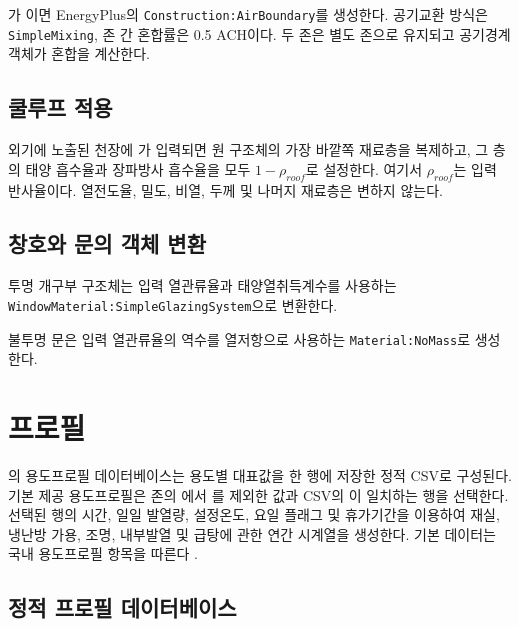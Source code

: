 가 이면 EnergyPlus의 \texttt{Construction:AirBoundary}를 생성한다. 공기교환 방식은 \texttt{SimpleMixing}, 존 간 혼합률은 0.5 ACH이다. 두 존은 별도 존으로 유지되고 공기경계 객체가 혼합을 계산한다.

\subsection{쿨루프 적용}

외기에 노출된 천장에 가 입력되면 원 구조체의 가장 바깥쪽 재료층을 복제하고, 그 층의 태양 흡수율과 장파방사 흡수율을 모두 $1-\rho_{roof}$로 설정한다. 여기서 $\rho_{roof}$는 입력 반사율이다. 열전도율, 밀도, 비열, 두께 및 나머지 재료층은 변하지 않는다.

\subsection{창호와 문의 객체 변환}

투명 개구부 구조체는 입력 열관류율과 태양열취득계수를 사용하는 \texttt{WindowMaterial:}\allowbreak\texttt{Simple}\allowbreak\texttt{Glazing}\allowbreak\texttt{System}으로 변환한다.

불투명 문은 입력 열관류율의 역수를 열저항으로 사용하는 \texttt{Material:NoMass}로 생성한다.



\section{프로필}
\label{section:profile-conversion}

\simulator 의 용도프로필 데이터베이스는 용도별 대표값을 한 행에 저장한 정적 CSV로 구성된다.
기본 제공 용도프로필은 존의 에서 를 제외한 값과 CSV의 이 일치하는 행을 선택한다.
선택된 행의 시간, 일일 발열량, 설정온도, 요일 플래그 및 휴가기간을 이용하여 재실, 냉난방 가용, 조명, 내부발열 및 급탕에 관한 연간 시계열을 생성한다.
기본 데이터는 국내 용도프로필 항목을 따른다 \cite{law:usageprofile}.

\subsection{정적 프로필 데이터베이스}


